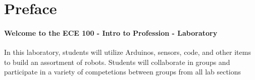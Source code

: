 \section{Preface}

\paragraph{Welcome to the ECE 100 - Intro to Profession - Laboratory}{
In this laboratory, students will utilize Arduinos, sensors, code, and other items to build an assortment of robots. Students will collaborate in groups and participate in a variety of competetions between groups from all lab sections}
